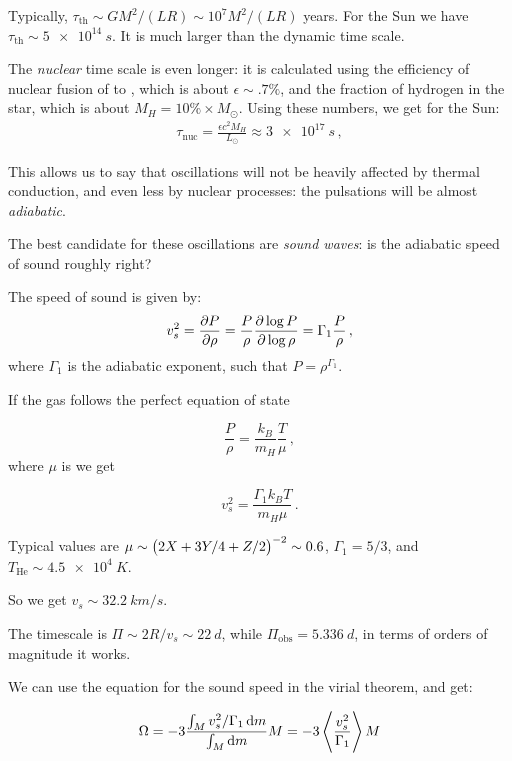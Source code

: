 \documentclass[main.tex]{subfiles}
\begin{document}
Typically, \(\tau_{\text{th}} \sim G M^2 /(LR) \sim 10^7 M^2/(LR) \) years.  
For the Sun we have \(\tau_{\text{th}} \sim \SI{5e14}{s}\). 
It is much larger than the dynamic time scale.

The \emph{nuclear} time scale is even longer: it is calculated using the efficiency of nuclear fusion of  to , which is about \(\epsilon \sim \num{.7} \% \), and the fraction of hydrogen in the star, which is about \(M_H = \num{10} \% \times M_{\odot} \). Using these numbers, we get for the Sun:
%
\begin{align}
\tau_{\text{nuc}} = \frac{\epsilon c^2  M_H}{L_{\odot}} \approx \SI{3e17}{s}
\,,
\end{align}
%


This allows us to say that oscillations will not be heavily affected by thermal conduction, and even less by nuclear processes: the pulsations will be almost \emph{adiabatic}.

The best candidate for these oscillations are \emph{sound waves}: is the adiabatic speed of sound roughly right?

The speed of sound is given by:
%
\begin{equation}
  v_s^2 = \pdv{P}{\rho } = \frac{P}{\rho} \pdv{\log P }{\log
  \rho } = \Gamma_1 \frac{P}{\rho}\,,
\end{equation}
%
where \(\Gamma_1 \) is the adiabatic exponent, such that \(P = \rho^{\Gamma_1 }\).  

If the gas follows the perfect equation of state

\begin{equation}
  \frac{P}{\rho} = \frac{k_B}{m_H} \frac{T}{\mu}  \,,
\end{equation}
%
where \(\mu \) is 
we get

\begin{equation}
  v_s^2 = \frac{\Gamma_1 k_B T}{m_H \mu}  \,.
\end{equation}

Typical values are \(\mu \sim \qty(2X + 3Y/4 + Z/2)^{-2} \sim 0.6\), \(\Gamma_1 = 5/3\), and \(T_{\text{He}} \sim \SI{4.5e4}{K} \).

So we get \(v_s \sim \SI{32.2}{km/s}\).

The timescale is \(\Pi \sim 2R/v_s \sim \SI{22}{d}\), while \(\Pi_{\text{obs}} = \SI{5.336}{d} \), in terms of orders of magnitude it works.

We can use the equation for the sound speed in the virial theorem, and get:

\begin{equation}
  \Omega = - 3 \frac{\int _{M}  v_s^2 / \Gamma_1 \dd{m}}{\int_M \dd{m}}M = -3 \expval{\frac{v_s^2}{\Gamma_1}} M
\end{equation}
\end{document}
